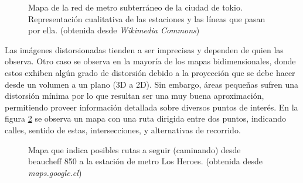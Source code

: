 \documentclass[12pt]{article}
\begin{document}
\begin{figure}[h] %
\caption{Mapa de la red de metro subterráneo de la ciudad de tokio. Representación cualitativa de las estaciones y las líneas que pasan por ella. (obtenida desde \textit{Wikimedia Commons})}
\label{fig:metro}
\end{figure}

Las imágenes distorsionadas tienden a ser imprecisas y dependen  de quien las observa. Otro caso se observa en la mayoría de los mapas bidimensionales, donde estos exhiben algún grado de distorsión debido a la proyección que se debe hacer desde un volumen a un plano (3D a 2D). Sin embargo, áreas pequeñas sufren una distorsión mínima por lo que resultan ser una muy buena aproximación, permitiendo proveer información detallada sobre diversos puntos de interés. En la figura \ref{fig:google_map} se observa un mapa con una ruta dirigida entre dos puntos, indicando calles, sentido de estas, intersecciones, y alternativas de recorrido.

\begin{figure}[h] %
\caption{Mapa que indica posibles rutas a seguir (caminando) desde beaucheff 850 a la estación de metro Los Heroes. (obtenida desde \textit{maps.google.cl})}
\label{fig:google_map}
\end{figure}
\end{document}
